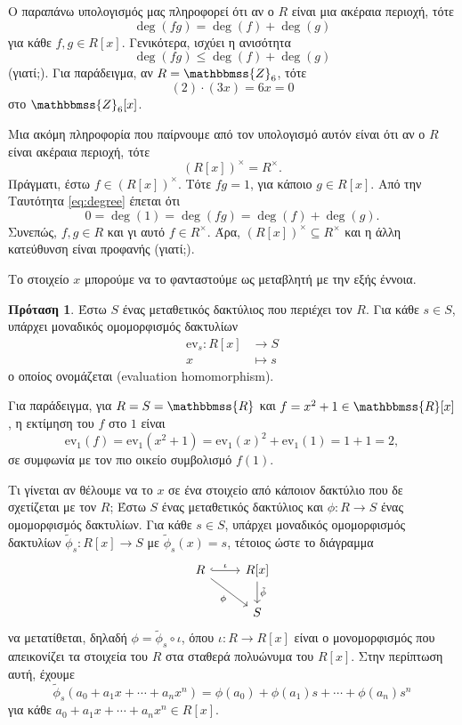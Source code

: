 \documentclass[12pt,a4paper,reqno]{amsart}
\theoremstyle{definition}
\newtheorem{proposition}[theorem]{Πρόταση}
\theoremstyle{remark}
\numberwithin{theorem}{section}
\numberwithin{exercise}{section}
\numberwithin{equation}{section}
\newcommand{\ZZ}{\mathbbmss{Z}}
\newcommand{\RR}{\mathbbmss{R}}
\renewcommand{\to}{\rightarrow}
\newcommand{\ev}{\mathrm{ev}}
\newcommand{\defn}[1]{{\color{mylightblue}{#1}}}
\begin{document}
Ο παραπάνω υπολογισμός μας πληροφορεί ότι αν ο $R$ είναι μια ακέραια περιοχή, τότε 
\begin{equation}
    \label{eq:degree}
    \deg(fg) = \deg(f) + \deg(g)
\end{equation}
για κάθε $f, g \in R[x]$. Γενικότερα, ισχύει η ανισότητα 
\[
\deg(fg) \leq \deg(f) + \deg(g)
\]
(γιατί;). Για παράδειγμα, αν $R = \ZZ_6$, τότε 
\[
(2)\cdot(3x) = 6x = 0
\]
στο $\ZZ_6[x]$.

Μια ακόμη πληροφορία που παίρνουμε από τον υπολογισμό αυτόν είναι ότι αν ο $R$ είναι ακέραια περιοχή, τότε 
\[
\left(R[x]\right)^\times = R^\times.
\]
Πράγματι, έστω $f \in \left(R[x]\right)^\times$. Τότε $fg = 1$, για κάποιο  $g \in R[x]$. Από την Ταυτότητα \eqref{eq:degree} έπεται ότι 
\[
0 = \deg(1) = \deg(fg) = \deg(f) + \deg(g).
\]
Συνεπώς, $f, g \in R$ και γι αυτό $f \in R^\times$. Άρα, $\left(R[x]\right)^\times \subseteq R^\times$ και η άλλη κατεύθυνση είναι προφανής (γιατί;).

Το στοιχείο $x$ μπορούμε να το φανταστούμε ως μεταβλητή με την εξής έννοια.
\begin{proposition}
    \label{prop:evaluation_hom}
    Έστω $S$ ένας μεταθετικός δακτύλιος που περιέχει τον $R$. Για κάθε $s \in S$, υπάρχει μοναδικός ομομορφισμός δακτυλίων
    \begin{align*}
        \ev_s : R[x] &\to S \\
                   x &\mapsto s
    \end{align*}
    ο οποίος ονομάζεται \defn{ομομορφισμός εκτίμησης} (evaluation homomorphism).
\end{proposition}

Για παράδειγμα, για $R = S = \RR$ και $f = x^2 + 1 \in \RR[x]$, η εκτίμηση του $f$ στο $1$ είναι 
\[
\ev_1(f) = \ev_1(x^2 + 1) = \ev_1(x)^2 + \ev_1(1) = 1 + 1 = 2,
\]
σε συμφωνία με τον πιο οικείο συμβολισμό $f(1)$.

Τι γίνεται αν θέλουμε να  το $x$ σε ένα στοιχείο από κάποιον δακτύλιο που δε σχετίζεται με τον $R$; Έστω $S$ ένας μεταθετικός δακτύλιος και $\phi : R \to S$ ένας ομομορφισμός δακτυλίων. Για κάθε $s \in S$, υπάρχει μοναδικός ομομορφισμός δακτυλίων $\tilde{\phi}_s : R[x] \to S$ με $\tilde{\phi}_s(x) = s$, τέτοιος ώστε το διάγραμμα 
\[
\begin{tikzcd}
    R \arrow[r, hook,"\iota"] \arrow[dr, "\phi"'] & R[x] \arrow[d, "\tilde{\phi}"] \\
                                           & S
\end{tikzcd}
\]
να μετατίθεται, δηλαδή $\phi = \tilde{\phi}_s \circ \iota$, όπου $\iota : R \to R[x]$ είναι ο  μονομορφισμός που απεικονίζει τα στοιχεία του $R$ στα σταθερά πολυώνυμα του $R[x]$. Στην περίπτωση αυτή, έχουμε 
\[
\tilde{\phi}_s(a_0 + a_1x + \cdots + a_nx^n) = 
\phi(a_0) + \phi(a_1)s + \cdots + \phi(a_n)s^n
\]
για κάθε $a_0 + a_1x + \cdots + a_nx^n \in R[x]$.
\end{document}
